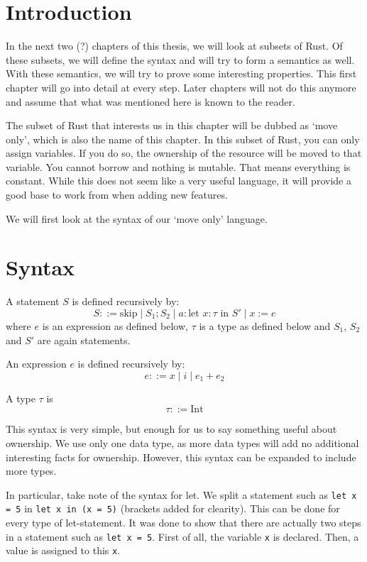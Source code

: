 

\section{Introduction}
In the next two (?) chapters of this thesis, we will look at subsets of Rust. Of these subsets, we will define the syntax and will try to form a semantics as well. With these semantics, we will try to prove some interesting properties. This first chapter will go into detail at every step. Later chapters will not do this anymore and assume that what was mentioned here is known to the reader.

The subset of Rust that interests us in this chapter will be dubbed as `move only', which is also the name of this chapter. In this subset of Rust, you can only assign variables. If you do so, the ownership of the resource will be moved to that variable. You cannot borrow and nothing is mutable. That means everything is constant. While this does not seem like a very useful language, it will provide a good base to work from when adding new features.

We will first look at the syntax of our `move only' language.

\section{Syntax}
\begin{definition}
A statement $S$ is defined recursively by:
$$S ::= \textrm{skip} \mid S_1; S_2 \mid a: \textrm{let } x:\tau \textrm{ in } S' \mid x := e$$
where $e$ is an expression as defined below, $\tau$ is a type as defined below and $S_1$, $S_2$ and $S'$ are again statements.
\end{definition}

\begin{definition}
An expression $e$ is defined recursively by:
$$e ::= x \mid i \mid e_1 + e_2$$
\end{definition}

\begin{definition}
A type $\tau$ is
$$\tau ::= \textrm{Int}$$
\end{definition}

This syntax is very simple, but enough for us to say something useful about ownership. We use only one data type, as more data types will add no additional interesting facts for ownership. However, this syntax can be expanded to include more types. 

In particular, take note of the syntax for let. We split a statement such as \verb|let x = 5| in \verb|let x in (x = 5)| (brackets added for clearity). This can be done for every type of let-statement. It was done to show that there are actually two steps in a statement such as \verb|let x = 5|. First of all, the variable \verb|x| is declared. Then, a value is assigned to this \verb|x|. 


